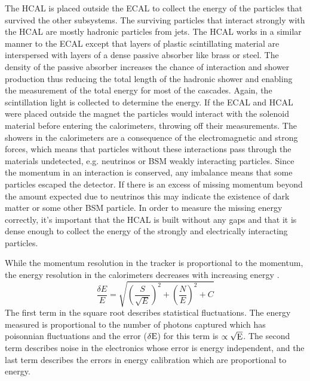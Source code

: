 The HCAL is placed outside the ECAL to collect the energy of the particles that survived the other subsystems. The surviving particles that interact strongly with the HCAL are mostly hadronic particles from jets. The HCAL works in a similar manner to the ECAL except that layers of plastic scintillating material are interspersed with layers of a dense passive absorber like brass or steel. The density of the passive absorber increases the chance of interaction and shower production thus reducing the total length of the hadronic shower and enabling the measurement of the total energy for most of the cascades. Again, the scintillation light is collected to determine the energy. If the ECAL and HCAL were placed outside the magnet the particles would interact with the solenoid material before entering the calorimeters, throwing off their measurements. The showers in the calorimeters are a consequence of the electromagnetic and strong forces, which means that particles without these interactions pass through the materials undetected, e.g. neutrinos or BSM weakly interacting particles. Since the momentum in an interaction is conserved, any imbalance means that some particles escaped the detector. If there is an excess of missing momentum beyond the amount expected due to neutrinos this may indicate the existence of dark matter or some other BSM particle. In order to measure the missing energy correctly, it's important that the HCAL is built without any gaps and that it is dense enough to collect the energy of the strongly and electrically interacting particles.

While the momentum resolution in the tracker is proportional to the momentum, the energy resolution in the calorimeters decreases with increasing energy \cite{pdgreview}.
\begin{equation}
\frac{\delta E}{E} = \sqrt{\left(\frac{S}{\sqrt{E}}\right)^2 + \left(\frac{N}{E}\right)^2 + C}
\end{equation}
The first term in the square root describes statistical fluctuations. The energy measured is proportional to the number of photons captured which has poisonnian fluctuations and the error (${\rm \delta E}$) for this term is $\propto \sqrt{{\rm E}}$. The second term describes noise in the electronics whose error is energy independent, and the last term describes the errors in energy calibration which are proportional to energy.

\FloatBarrier
